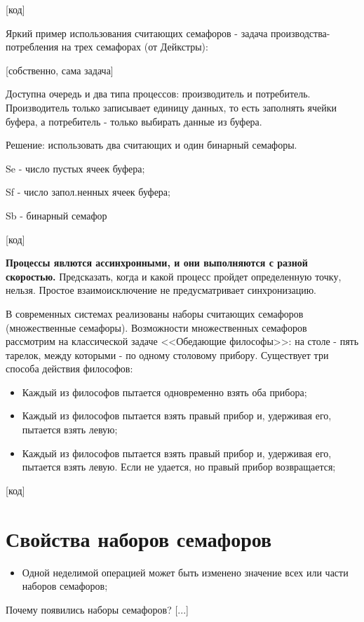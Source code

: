 \documentclass[a4paper, 14pt]{report}
\begin{document}
	[код]
	
	Яркий пример использования считающих семафоров - задача производства-потребления на трех семафорах (от Дейкстры):
	
	[собственно, сама задача]
	
	Доступна очередь и два типа процессов: производитель и потребитель. Производитель только записывает единицу данных, то есть заполнять ячейки буфера, а потребитель - только выбирать данные из буфера.
	
	Решение: использовать два считающих и один бинарный семафоры.
	
	Se - число пустых ячеек буфера;
	
	Sf - число запол.ненных ячеек буфера;
	
	Sb - бинарный семафор
	
	[код]
	
	{\bf Процессы явлются ассинхронными, и они выполняются с разной скоростью.} Предсказать, когда и какой процесс пройдет определенную точку, нельзя. Простое взаимоисключение не предусматривает синхронизацию.
	
	В современных системах реализованы наборы считающих семафоров (множественные семафоры). Возможности множественных семафоров рассмотрим на классической задаче <<Обедающие философы>>: на столе - пять тарелок, между которыми - по одному столовому прибору. Существует три способа действия философов:
	
	\begin{itemize}
		\item Каждый из философов пытается одновременно взять оба прибора;
		\item Каждый из философов пытается взять правый прибор и, удерживая его, пытается взять левую;
		\item Каждый из философов пытается взять правый прибор и, удерживая его, пытается взять левую. Если не удается, но правый прибор возвращается;
	\end{itemize}

	[код]
	
	\section*{Свойства наборов семафоров}
	
	\begin{itemize}
		\item Одной неделимой операцией может быть изменено значение всех или части наборов семафоров;
	\end{itemize}

	Почему появились наборы семафоров? [...]
\end{document}
